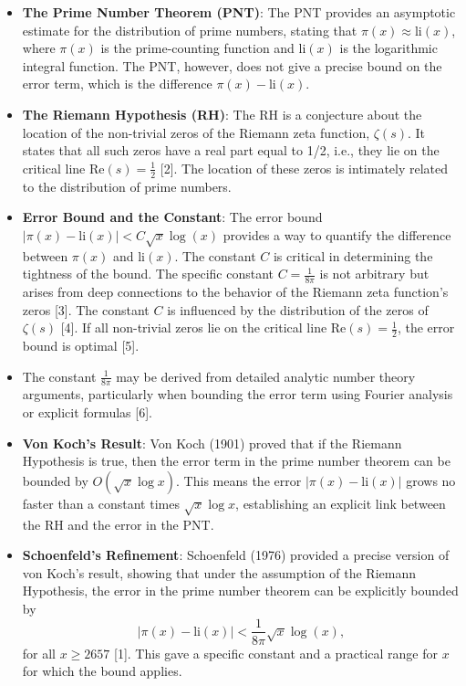 \documentclass{article}
\begin{document}
\begin{itemize}
    \item \textbf{The Prime Number Theorem (PNT)}: The PNT provides an asymptotic estimate for the distribution of prime numbers, stating that $\pi(x) \approx \text{li}(x)$, where $\pi(x)$ is the prime-counting function and $\text{li}(x)$ is the logarithmic integral function. The PNT, however, does not give a precise bound on the error term, which is the difference $\pi(x) - \text{li}(x)$.
    \item \textbf{The Riemann Hypothesis (RH)}: The RH is a conjecture about the location of the non-trivial zeros of the Riemann zeta function, $\zeta(s)$. It states that all such zeros have a real part equal to 1/2, i.e., they lie on the critical line $\text{Re}(s) = \frac{1}{2}$ [2]. The location of these zeros is intimately related to the distribution of prime numbers.
    \item \textbf{Error Bound and the Constant}: The error bound $|\pi(x) - \text{li}(x)| < C \sqrt{x} \log(x)$ provides a way to quantify the difference between $\pi(x)$ and $\text{li}(x)$. The constant $C$ is critical in determining the tightness of the bound. The specific constant $C = \frac{1}{8\pi}$ is not arbitrary but arises from deep connections to the behavior of the Riemann zeta function's zeros [3]. The constant $C$ is influenced by the distribution of the zeros of $\zeta(s)$ [4]. If all non-trivial zeros lie on the critical line $\text{Re}(s) = \frac{1}{2}$, the error bound is optimal [5].
      \item The constant $\frac{1}{8\pi}$ may be derived from detailed analytic number theory arguments, particularly when bounding the error term using Fourier analysis or explicit formulas [6].
    \item  \textbf{Von Koch's Result}: Von Koch (1901) proved that if the Riemann Hypothesis is true, then the error term in the prime number theorem can be bounded by $O(\sqrt{x}\log x)$. This means the error $|\pi(x) - \text{li}(x)|$ grows no faster than a constant times $\sqrt{x}\log x$, establishing an explicit link between the RH and the error in the PNT.
    \item \textbf{Schoenfeld's Refinement}: Schoenfeld (1976) provided a precise version of von Koch's result, showing that under the assumption of the Riemann Hypothesis, the error in the prime number theorem can be explicitly bounded by 
      $$
      |\pi(x) - \text{li}(x)| < \frac{1}{8\pi} \sqrt{x} \log(x),
      $$
      for all $x \geq 2657$ [1]. This gave a specific constant and a practical range for $x$ for which the bound applies.

\end{itemize}
\end{document}
